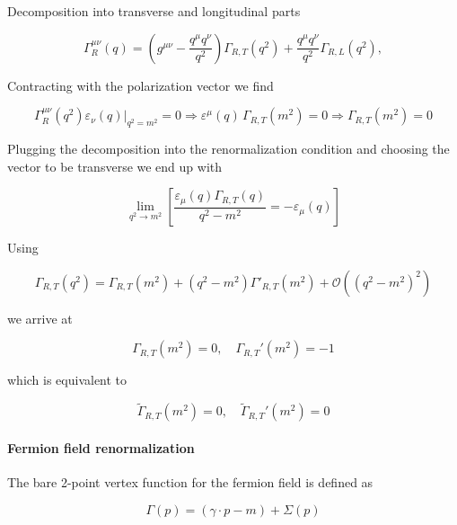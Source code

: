 \documentclass[../FeynCalcManual.tex]{subfiles}
\begin{document}
Decomposition into transverse and longitudinal parts

\begin{equation}
    \Gamma_R^{\mu \nu} (q) = \left ( g^{\mu \nu} - \frac{q^\mu q^\nu}{q^2} \right ) \Gamma_{R,T} (q^2) + \frac{q^\mu q^\nu}{q^2} \Gamma_{R,L} (q^2),
\end{equation}

Contracting with the polarization vector we find

\begin{equation}
     \Gamma_R^{\mu \nu} (q^2)  \varepsilon_\nu (q) \biggl |_{q^2=m^2}  = 0 \Rightarrow \varepsilon^\mu (q) \, \Gamma_{R,T} (m^2) = 0 \Rightarrow \Gamma_{R,T} (m^2) = 0
\end{equation}

Plugging the decomposition into the renormalization condition and
choosing the vector to be transverse we end up with

\begin{equation}
        \lim_{q^2 \to m^2} \left [ \frac{\varepsilon_{\mu}(q) \Gamma_{R,T} (q)}{q^2 -m ^2}  = - \varepsilon_{\mu}(q) \right ]
\end{equation}

Using

\begin{equation}
    \Gamma_{R,T} (q^2) =  \Gamma_{R,T} (m^2) + (q^2 - m^2) \Gamma'_{R,T} (m^2) + \mathcal{O}( (q^2 - m^2)^2)
\end{equation}

we arrive at

\begin{equation}
    \Gamma_{R,T}(m^2) = 0, \quad \Gamma_{R,T}'(m^2) = -1
\end{equation}

which is equivalent to

\begin{equation}
    \tilde{\Gamma}_{R,T}(m^2) = 0, \quad \tilde{\Gamma}_{R,T}'(m^2) = 0
\end{equation}

\hypertarget{fermion-field-renormalization}{%
\paragraph{Fermion field
renormalization}\label{fermion-field-renormalization}}

The bare 2-point vertex function for the fermion field is defined as

\begin{equation}
    \Gamma(p) = (\gamma \cdot p - m) + \Sigma(p)
\end{equation}
\end{document}
